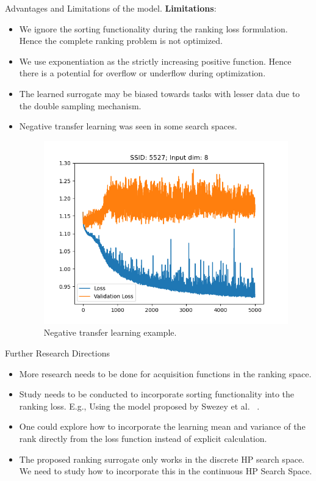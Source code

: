 \documentclass{beamer}
\begin{document}
\begin{frame}[t]{Advantages and Limitations of the model.}
\textbf{Limitations}:
\begin{itemize}
\item We ignore the sorting functionality during the ranking loss formulation. Hence the complete ranking problem is not optimized.
\item We use exponentiation as the strictly increasing positive function. 
Hence there is a potential for overflow or underflow during optimization.
\item The learned surrogate may be biased towards tasks with lesser data due to the double sampling mechanism.
\item Negative transfer learning was seen in some search spaces.

\begin{figure}[htb]
  \centering
    \includegraphics[scale=0.25]{images/NegativeLearning}
    \caption{Negative transfer learning example.}
    \label{fig:NegativeLearning}
\end{figure}

\end{itemize}
\end{frame}

\begin{frame}[t]{Further Research Directions}
\begin{itemize}
\item More research needs to be done for acquisition functions in the ranking space.
\item Study needs to be conducted to incorporate sorting functionality into the ranking loss. E.g., Using the model proposed by Swezey et al. ~\cite{PiRank}.
\item One could explore how to incorporate the learning mean and variance of the rank directly from the loss function instead of explicit calculation.
\item The proposed ranking surrogate only works in the discrete HP search space. We need to study how to incorporate this in the continuous HP Search Space.
\end{itemize}
\end{frame}
\end{document}
